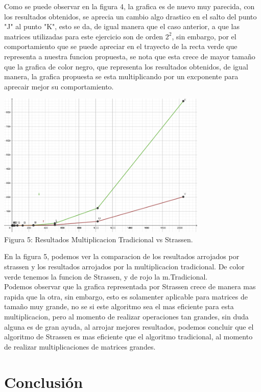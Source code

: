 \documentclass[spanish]{article}
\begin{document}
	Como se puede observar en la figura 4, la grafica es de nuevo muy parecida, con los resultados obtenidos, se aprecia un cambio algo drastico en el salto del punto "J" al punto "K", esto se da, de igual manera que el caso anterior, a que las matrices utilizadas para este ejercicio son de orden ${2^{2}}$, sin embargo, por el comportamiento que se puede apreciar en el trayecto de la recta verde que representa a nuestra funcion propuesta, se nota que esta crece de mayor tamaño que la grafica de color negro, que representa los resultados obtenidos, de igual manera, la grafica propuesta se esta multiplicando por un excponente para aprecair mejor su comportamiento.
\newpage
	\begin{center}
		\includegraphics[width=100mm]{./imagenes/fig6.png}\\
		Figura 5: Resultados Multiplicacion Tradicional vs Strassen.
	\end{center}
	En la figura 5, podemos ver la comparacion de los resultados arrojados por strassen y los resultados arrojados por la multiplicacion tradicional. De color verde tenemos la funcion de Strassen, y de rojo la m.Tradicional.\\
	Podemos observar que la grafica representada por Strassen crece de manera mas rapida que la otra, sin embargo, esto es solamenter aplicable para matrices de tamaño muy grande, no se si este algoritmo sea el mas eficiente para esta multiplicacion, pero al momento de realizar operaciones tan grandes, sin duda alguna es de gran ayuda, al arrojar mejores resultados, podemos concluir que el algoritmo de Strassen es mas eficiente que el algoritmo tradicional, al momento de realizar multiplicaciones de matrices grandes.
	\newpage

	\section{Conclusi\'on}
\end{document}
